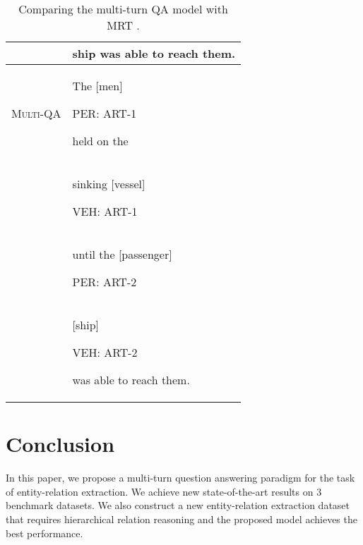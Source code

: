 \documentclass[11pt,a4paper]{article}
\begin{document}
\begin{table}[!ht]
\begin{tabular}{ll}
& ship was able to reach them. \\\hline 
\textsc{Multi-QA} & The [men]\begin{tiny} PER: ART-1\end{tiny} held on the \\
& sinking [vessel]\begin{tiny} VEH: ART-1\end{tiny} \\
& until the [passenger]\begin{tiny} PER: ART-2\end{tiny} \\
& [ship]\begin{tiny} VEH: ART-2\end{tiny} was able to reach them. \\\hline 
\end{tabular}
\caption{Comparing the multi-turn QA model with MRT \cite{sun2018extracting}.}
\label{case}
\end{table}

\section{Conclusion}
In this paper, we propose a multi-turn question answering paradigm for the task of entity-relation extraction. We achieve new state-of-the-art results on 3 benchmark datasets. 
We also construct a new entity-relation extraction dataset that requires hierarchical relation reasoning and the proposed model achieves the best performance. 


\end{document}
